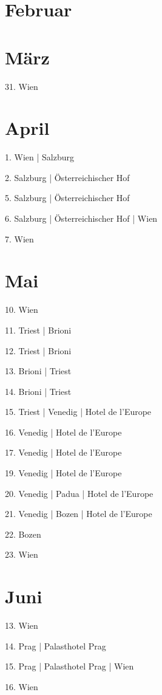 \documentclass[twoside=false,titlepage=false,open=any, parskip=never, fontsize=10pt, headings=small, chapterprefix=false, appendixprefix=false, DIV=15]{scrbook}
\begin{document}
\begin{multicols}{3}
            \section*{Februar}
            \section*{März}
            31. Wien\par
            \section*{April}
            1. Wien | Salzburg\par
            2. Salzburg | Österreichischer Hof\par
            5. Salzburg | Österreichischer Hof\par
            6. Salzburg | Österreichischer Hof | Wien\par
            7. Wien\par
            \section*{Mai}
            10. Wien\par
            11. Triest | Brioni\par
            12. Triest | Brioni\par
            13. Brioni | Triest\par
            14. Brioni | Triest\par
            15. Triest | Venedig | Hotel de l’Europe\par
            16. Venedig | Hotel de l’Europe\par
            17. Venedig | Hotel de l’Europe\par
            19. Venedig | Hotel de l’Europe\par
            20. Venedig | Padua | Hotel de l’Europe\par
            21. Venedig | Bozen | Hotel de l’Europe\par
            22. Bozen\par
            23. Wien\par
            \section*{Juni}
            13. Wien\par
            14. Prag | Palasthotel Prag\par
            15. Prag | Palasthotel Prag | Wien\par
            16. Wien\par

\end{multicols}
\end{document}
